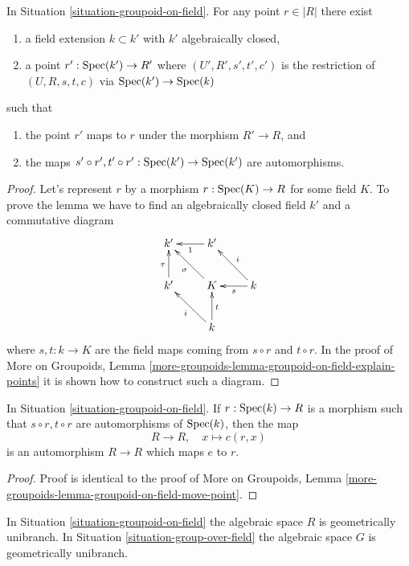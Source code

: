 \begin{lemma}
\label{lemma-groupoid-on-field-explain-points}
In
Situation \ref{situation-groupoid-on-field}.
For any point $r \in |R|$ there exist
\begin{enumerate}
\item a field extension $k \subset k'$ with $k'$ algebraically closed,
\item a point $r' : \mathop{\rm Spec}(k') \to R'$ where
$(U', R', s', t', c')$ is the restriction of $(U, R, s, t, c)$
via $\mathop{\rm Spec}(k') \to \mathop{\rm Spec}(k)$
\end{enumerate}
such that
\begin{enumerate}
\item the point $r'$ maps to $r$ under the morphism $R' \to R$, and
\item the maps
$s' \circ r', t' \circ r' : \mathop{\rm Spec}(k') \to \mathop{\rm Spec}(k')$
are automorphisms.
\end{enumerate}
\end{lemma}

\begin{proof}
Let's represent $r$ by a morphism $r : \mathop{\rm Spec}(K) \to R$ for some
field $K$. To prove the lemma we have to find an algebraically closed
field $k'$ and a commutative diagram
$$
\xymatrix{
k' & k' \ar[l]^1 & \\
k' \ar[u]^\tau & K \ar[lu]^\sigma & k \ar[l]^-s \ar[lu]_i \\
& k \ar[lu]^i \ar[u]_t
}
$$
where $s, t : k \to K$ are the field maps coming from
$s \circ r$ and $t \circ r$. In the proof of
More on Groupoids,
Lemma \ref{more-groupoids-lemma-groupoid-on-field-explain-points}
it is shown how to construct such a diagram.
\end{proof}

\begin{lemma}
\label{lemma-groupoid-on-field-move-point}
In
Situation \ref{situation-groupoid-on-field}.
If $r : \mathop{\rm Spec}(k) \to R$ is a morphism such that
$s \circ r, t \circ r$ are automorphisms of $\mathop{\rm Spec}(k)$, then the map
$$
R \longrightarrow R, \quad
x \longmapsto c(r, x)
$$
is an automorphism $R \to R$ which maps $e$ to $r$.
\end{lemma}

\begin{proof}
Proof is identical to the proof of
More on Groupoids,
Lemma \ref{more-groupoids-lemma-groupoid-on-field-move-point}.
\end{proof}

\begin{lemma}
\label{lemma-groupoid-on-field-geometrically-irreducible}
In
Situation \ref{situation-groupoid-on-field}
the algebraic space $R$ is geometrically unibranch. In
Situation \ref{situation-group-over-field}
the algebraic space $G$ is geometrically unibranch.
\end{lemma}

